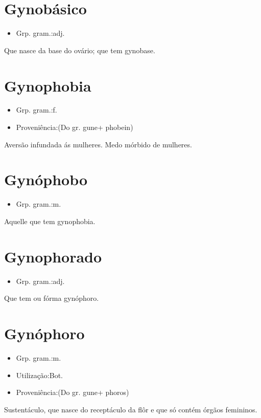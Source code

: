 \section{Gynobásico}
\begin{itemize}
\item {Grp. gram.:adj.}
\end{itemize}
Que nasce da base do ovário; que tem gynobase.
\section{Gynophobia}
\begin{itemize}
\item {Grp. gram.:f.}
\end{itemize}
\begin{itemize}
\item {Proveniência:(Do gr. \textunderscore gune\textunderscore  + \textunderscore phobein\textunderscore )}
\end{itemize}
Aversão infundada ás mulheres.
Medo mórbido de mulheres.
\section{Gynóphobo}
\begin{itemize}
\item {Grp. gram.:m.}
\end{itemize}
Aquelle que tem gynophobia.
\section{Gynophorado}
\begin{itemize}
\item {Grp. gram.:adj.}
\end{itemize}
Que tem ou fórma gynóphoro.
\section{Gynóphoro}
\begin{itemize}
\item {Grp. gram.:m.}
\end{itemize}
\begin{itemize}
\item {Utilização:Bot.}
\end{itemize}
\begin{itemize}
\item {Proveniência:(Do gr. \textunderscore gune\textunderscore  + \textunderscore phoros\textunderscore )}
\end{itemize}
Sustentáculo, que nasce do receptáculo da flôr e que só contém órgãos femininos.
